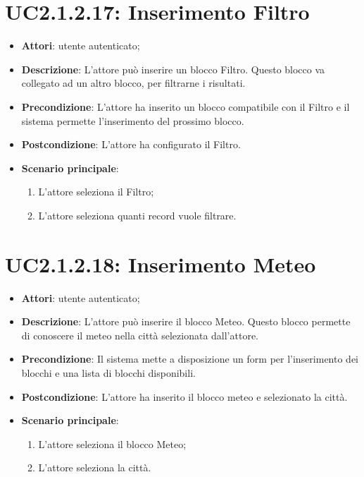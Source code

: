 \section{UC2.1.2.17: Inserimento Filtro}
\label{UC2.1.2.17}
\begin{itemize}
	\item \textbf{Attori}: utente autenticato;
	\item \textbf{Descrizione}: L'attore può inserire un blocco Filtro. Questo blocco va collegato ad un altro blocco, per filtrarne i risultati. 
	\item \textbf{Precondizione}: L'attore ha inserito un blocco compatibile con il Filtro e il sistema permette l'inserimento del prossimo blocco.
	\item \textbf{Postcondizione}: L'attore ha configurato il Filtro. 
	\item \textbf{Scenario principale}:
	\begin{enumerate} \item L'attore seleziona il Filtro;  \item  L'attore seleziona quanti record vuole filtrare.\end{enumerate}
\end{itemize}

\section{UC2.1.2.18: Inserimento Meteo}
\label{UC2.1.2.18}
\begin{itemize}
	\item \textbf{Attori}: utente autenticato;
	\item \textbf{Descrizione}: L'attore può inserire il blocco Meteo. Questo blocco permette di conoscere il meteo nella città selezionata dall'attore.
	\item \textbf{Precondizione}: Il sistema mette a disposizione un form per l'inserimento dei blocchi e una lista di blocchi disponibili.	
	\item \textbf{Postcondizione}: L'attore ha inserito il blocco meteo e selezionato la città.
	\item \textbf{Scenario principale}:
	\begin{enumerate} \item L'attore seleziona il blocco Meteo;  \item  L'attore seleziona la città.\end{enumerate}
\end{itemize}


